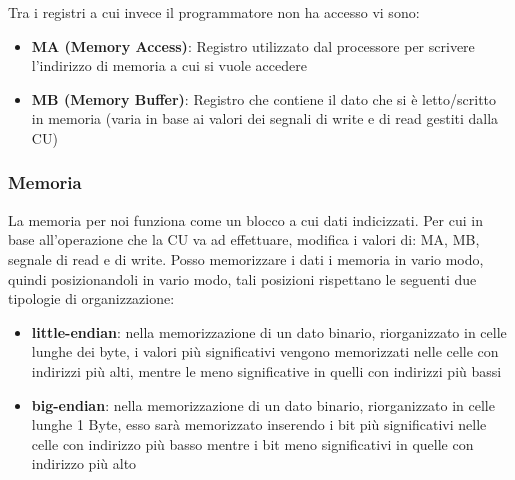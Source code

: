 Tra i registri a cui invece il programmatore non ha accesso vi sono:
\begin{itemize}
    \item \textbf{MA (Memory Access)}: Registro utilizzato dal processore per scrivere l'indirizzo di memoria a cui si vuole accedere
    \item \textbf{MB (Memory Buffer)}: Registro che contiene il dato che si è letto/scritto in memoria (varia in base ai valori dei segnali di write e di read gestiti dalla CU)
\end{itemize}

\subsubsection{Memoria}
La memoria per noi funziona come un blocco a cui dati indicizzati. Per cui in base all'operazione che la CU va ad effettuare, modifica i valori di: MA, MB, segnale di read e di write.
Posso memorizzare i dati i memoria in vario modo, quindi posizionandoli in vario modo, tali posizioni rispettano le seguenti due tipologie di organizzazione:
\begin{itemize}
    \item \textbf{little-endian}: nella memorizzazione di un dato binario, riorganizzato in celle lunghe dei byte, i valori più significativi vengono memorizzati nelle celle con indirizzi più alti, mentre le meno significative in quelli con indirizzi più bassi
    \item \textbf{big-endian}: nella memorizzazione di un dato binario, riorganizzato in celle lunghe 1 Byte, esso sarà memorizzato inserendo i bit più significativi nelle celle con indirizzo più basso mentre i bit meno significativi in quelle con indirizzo più alto
\end{itemize}

